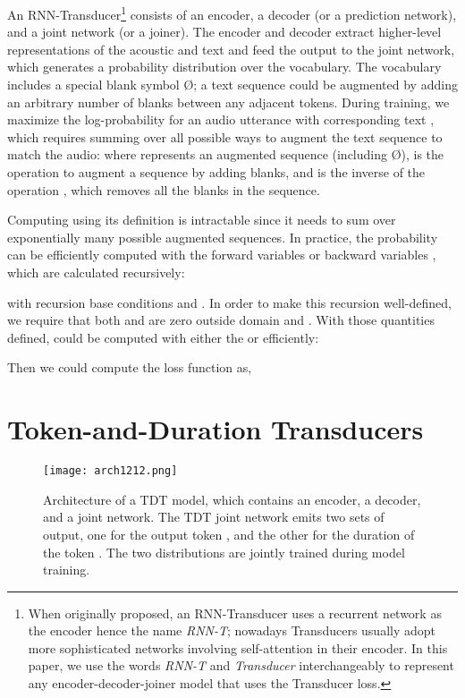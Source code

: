 \documentclass{article}
\begin{document}
An RNN-Transducer\footnote{When originally proposed, an RNN-Transducer uses a recurrent network as the encoder hence the name \emph{RNN-T};  nowadays Transducers usually adopt more sophisticated networks involving self-attention in their encoder. In this paper, we use the words \emph{RNN-T} and \emph{Transducer} interchangeably to represent any encoder-decoder-joiner model that uses the Transducer loss.} \cite{graves2012sequence} consists of an  encoder, 
a decoder (or a prediction network), and a joint network (or a joiner). 
The encoder and decoder extract higher-level representations of the acoustic and text  and feed the output to the joint network, which generates a probability distribution over the vocabulary.
The vocabulary includes a special blank symbol \O; a text sequence could be augmented by adding an arbitrary number of blanks between any adjacent tokens. During training, we maximize the log-probability  for an audio utterance  with corresponding text , which requires summing over all possible ways to augment the text sequence to match the audio:
where  represents an augmented sequence (including \O), 
 is the operation to augment a sequence by adding blanks, and  is the inverse of the operation , which  
removes all the blanks in the sequence. 

Computing   using its definition is intractable since it needs to sum over exponentially many possible augmented sequences. In practice, the probability can be efficiently computed with the forward variables  or backward variables , which are calculated recursively:

with recursion base conditions  and .
In order to make this recursion well-defined, we require that  both  and   are zero outside domain   and .
With those quantities defined,
 could be computed with either the  or  efficiently: 


Then we could compute the loss function as,






 \section{Token-and-Duration Transducers}\label{tdt}
 
 \begin{figure}[t]
    \centering
    \texttt{[image: arch1212.png]}
    \caption{Architecture of a TDT model, which contains an encoder, a decoder, and a joint network. The TDT joint network emits two sets of output, one for the output token , and the other for the duration of the token  . The two distributions are jointly trained during model training.}
    \label{new_arch}
\end{figure}
\end{document}
